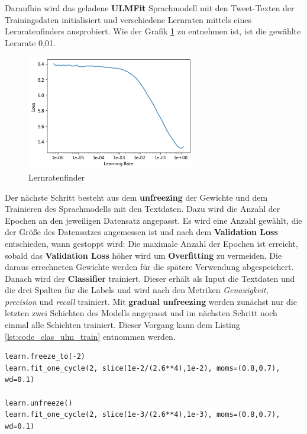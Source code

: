 Daraufhin wird das geladene \textbf{ULMFit} Sprachmodell mit den Tweet-Texten der Trainingsdaten initialisiert und verschiedene Lernraten mittels eines Lernratenfinders ausprobiert. Wie der Grafik \ref{fig:lr_ulmfit} zu entnehmen ist, ist die gew\"ahlte Lernrate 0,01.
\begin{figure}[!ht]
\centering
\includegraphics[height=5cm]{pics/lr_finder_ulmfit.png}
\caption{Lernratenfinder}
\label{fig:lr_ulmfit}
\end{figure}
Der n\"achste Schritt besteht aus dem \textbf{unfreezing} der Gewichte und dem Trainieren des Sprachmodells mit den Textdaten. Dazu wird die Anzahl der Epochen an den jeweiligen Datensatz angepasst. Es wird eine Anzahl gew\"ahlt, die der Gr\"o{\ss}e des Datensatzes angemessen ist und nach dem \textbf{Validation Loss} entschieden, wann gestoppt wird: Die maximale Anzahl der Epochen ist erreicht, sobald das \textbf{Validation Loss} h\"oher wird um \textbf{Overfitting} zu vermeiden. Die daraus errechneten Gewichte werden f\"ur die sp\"atere Verwendung abgespeichert.\\
Danach wird der \textbf{Classifier} trainiert. Dieser erh\"alt als Input die Textdaten und die drei Spalten f\"ur die Labels und wird nach den Metriken \textit{Genauigkeit, precision} und \textit{recall} trainiert. Mit \textbf{gradual unfreezing} werden zun\"achst nur die letzten zwei Schichten des Modells angepasst und im n\"achsten Schritt noch einmal alle Schichten trainiert. Dieser Vorgang kann dem Listing \ref{lst:code_clas_ulm_train} entnommen werden.
\lstset{language=Python}
\lstset{frame=lines}
\lstset{captionpos=b}
\lstset{basicstyle=\footnotesize}
\begin{lstlisting}
learn.freeze_to(-2)
learn.fit_one_cycle(2, slice(1e-2/(2.6**4),1e-2), moms=(0.8,0.7), wd=0.1)

learn.unfreeze()
learn.fit_one_cycle(2, slice(1e-3/(2.6**4),1e-3), moms=(0.8,0.7), wd=0.1)
\end{lstlisting}

